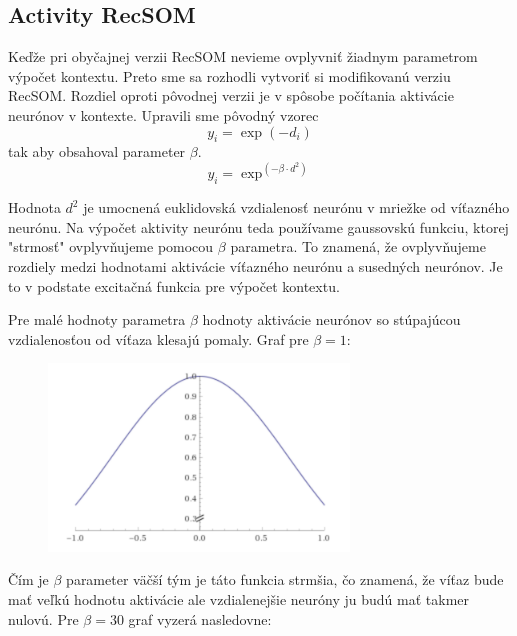 

\subsection{Activity RecSOM}
Keďže pri obyčajnej verzii RecSOM nevieme ovplyvniť žiadnym parametrom výpočet kontextu. Preto sme sa 
rozhodli vytvoriť si modifikovanú verziu RecSOM. Rozdiel oproti pôvodnej verzii je v spôsobe počítania 
aktivácie neurónov v kontexte. 
Upravili sme pôvodný vzorec %
\begin{equation}
    y_{i} = \exp{(-d_{i})}
\end{equation}
tak aby obsahoval parameter $\beta$.
\begin{equation}
    y_{i} = \exp^{(-\beta \cdot d^2)}
\end{equation}

Hodnota $d^2$ je umocnená euklidovská vzdialenosť neurónu v mriežke od víťazného neurónu.
Na výpočet aktivity neurónu teda používame gaussovskú funkciu, ktorej "strmosť" ovplyvňujeme
pomocou $\beta$ parametra. To znamená, že ovplyvňujeme rozdiely medzi hodnotami aktivácie víťazného neurónu
a susedných neurónov. Je to v podstate excitačná funkcia pre výpočet kontextu.

Pre malé hodnoty parametra $\beta$ hodnoty aktivácie neurónov so stúpajúcou vzdialenosťou od víťaza
klesajú pomaly. Graf pre $\beta = 1$:

\begin{figure}[H]
    \centering
    \includegraphics[width=8cm]{assets/gaus1}
    \caption{}
\end{figure}

Čím je $\beta$ parameter väčší tým je táto funkcia strmšia, čo znamená, že víťaz bude mať veľkú hodnotu aktivácie
ale vzdialenejšie neuróny ju budú mať takmer nulovú.
Pre $\beta = 30$ graf vyzerá nasledovne:

